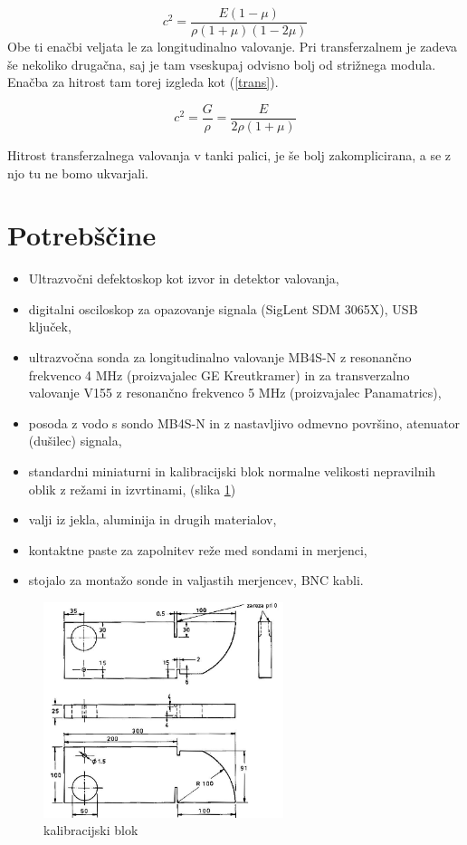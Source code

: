 \documentclass[10pt]{article}
\begin{document}
\begin{equation}
    c^{2} = \frac{E(1-\mu)}{\rho(1+\mu)(1-2\mu)}
    \label{razsežna}
\end{equation}
Obe ti enačbi veljata le za longitudinalno valovanje. Pri transferzalnem je zadeva še nekoliko drugačna, saj je tam vseskupaj odvisno bolj od strižnega modula. Enačba za hitrost tam torej izgleda kot (\ref{trans}).

\begin{equation}
    c^2 = \frac{G}{\rho} = \frac{E}{2\rho(1+\mu)}
    \label{trans}
\end{equation}

Hitrost transferzalnega valovanja v tanki palici, je še bolj zakomplicirana, a se z njo tu ne bomo ukvarjali.

\section{Potrebščine}

\begin{itemize}
    \item Ultrazvočni defektoskop kot izvor in detektor valovanja,
    \item digitalni osciloskop za opazovanje signala (SigLent SDM 3065X), USB ključek,
    \item ultrazvočna sonda za longitudinalno valovanje MB4S-N z resonančno frekvenco 4 MHz (proizvajalec GE Kreutkramer) in za transverzalno valovanje V155 z resonančno frekvenco 5 MHz (proizvajalec Panamatrics),
    \item posoda z vodo s sondo MB4S-N in z nastavljivo odmevno površino, atenuator (dušilec) signala,
    \item standardni miniaturni in kalibracijski blok normalne velikosti nepravilnih oblik z režami in izvrtinami, (slika \ref{blok})
    \item valji iz jekla, aluminija in drugih materialov,
    \item kontaktne paste za zapolnitev reže med sondami in merjenci,
    \item stojalo za montažo sonde in valjastih merjencev, BNC kabli.
\end{itemize}

\begin{figure}[h]
\begin{center}
    \includegraphics[width=7cm]{blok.png}
    \caption{kalibracijski blok}
    \label{blok}
\end{center}
\end{figure}
\end{document}
